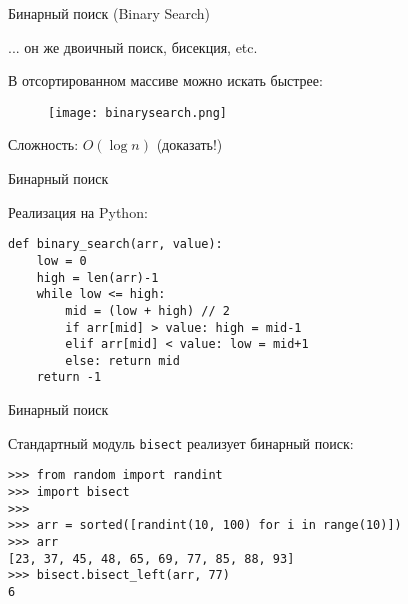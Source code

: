 
\begin{frame}{Бинарный поиск (Binary Search)}

... он же двоичный поиск, бисекция, etc.

В отсортированном массиве можно искать быстрее:

\begin{figure}
  \centering
  \texttt{[image: binarysearch.png]}
\end{figure}

Сложность: $O(\log n)$ (доказать!)

\end{frame}


\begin{frame}[fragile]{Бинарный поиск}

Реализация на Python:
\begin{verbatim}
def binary_search(arr, value):
    low = 0
    high = len(arr)-1
    while low <= high: 
        mid = (low + high) // 2
        if arr[mid] > value: high = mid-1
        elif arr[mid] < value: low = mid+1
        else: return mid
    return -1
\end{verbatim}

\end{frame}


\begin{frame}[fragile]{Бинарный поиск}

Стандартный модуль \texttt{bisect} реализует бинарный поиск:
\begin{verbatim}
>>> from random import randint
>>> import bisect
>>> 
>>> arr = sorted([randint(10, 100) for i in range(10)])
>>> arr
[23, 37, 45, 48, 65, 69, 77, 85, 88, 93]
>>> bisect.bisect_left(arr, 77)
6
\end{verbatim}

\end{frame}


